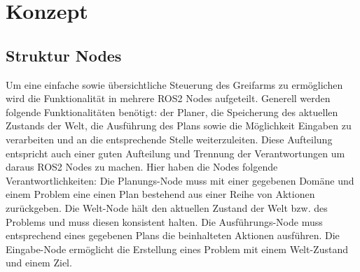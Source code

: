 \chapter{Konzept}
\section{Struktur Nodes}
Um eine einfache sowie übersichtliche Steuerung des Greifarms zu ermöglichen wird die Funktionalität in mehrere ROS2 Nodes aufgeteilt. Generell werden folgende Funktionalitäten benötigt: der Planer, die Speicherung des aktuellen Zustands der Welt, die Ausführung des Plans sowie die Möglichkeit Eingaben zu verarbeiten und an die entsprechende Stelle weiterzuleiten.\newline
Diese Aufteilung entspricht auch einer guten Aufteilung und Trennung der Verantwortungen um daraus ROS2 Nodes zu machen. Hier haben die Nodes folgende Verantwortlichkeiten:\newline
Die Planungs-Node muss mit einer gegebenen Domäne und einem Problem eine einen Plan bestehend aus einer Reihe von Aktionen zurückgeben.\newline
Die Welt-Node hält den aktuellen Zustand der Welt bzw. des Problems und muss diesen konsistent halten.\newline
Die Ausführungs-Node muss entsprechend eines gegebenen Plans die beinhalteten Aktionen ausführen.\newline
Die Eingabe-Node ermöglicht die Erstellung eines Problem mit einem Welt-Zustand und einem Ziel.